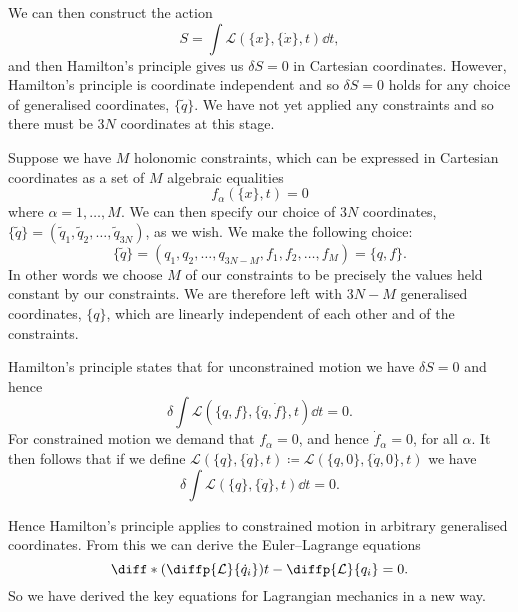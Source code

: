\documentclass[fleqn]{NotesClass}
\newcommand*{\lagrangian}{\mathcal{L}}
\begin{document}
    We can then construct the action
    \begin{equation}
        S = \int \!\! \lagrangian(\{x\}, \{\dot{x}\}, t) \dd{t},
    \end{equation}
    and then Hamilton's principle gives us \(\delta S = 0\) in Cartesian coordinates.
    However, Hamilton's principle is coordinate independent and so \(\delta S = 0\) holds for any choice of generalised coordinates, \(\{\tilde{q}\}\).
    We have not yet applied any constraints and so there must be \(3N\) coordinates at this stage.
    
    Suppose we have \(M\) holonomic constraints, which can be expressed in Cartesian coordinates as a set of \(M\) algebraic equalities
    \begin{equation}
        f_\alpha(\{x\}, t) = 0
    \end{equation}
    where \(\alpha = 1, \dotsc, M\).
    We can then specify our choice of \(3N\) coordinates, \(\{\tilde{q}\} = (\tilde{q}_1, \tilde{q}_2, \dotsc, \tilde{q}_{3N})\), as we wish.
    We make the following choice:
    \begin{equation}
        \{\tilde{q}\} = (q_1, q_2, \dotsc, q_{3N - M}, f_1, f_2, \dotsc, f_M) = \{q, f\}.
    \end{equation}
    In other words we choose \(M\) of our constraints to be precisely the values held constant by our constraints.
    We are therefore left with \(3N - M\) generalised coordinates, \(\{q\}\), which are linearly independent of each other and of the constraints.
    
    Hamilton's principle states that for unconstrained motion we have \(\delta S = 0\) and hence
    \begin{equation}
        \delta \int \!\! \lagrangian(\{q, f\}, \{\dot{q}, \dot{f}\}, t) \dd{t} = 0.
    \end{equation}
    For constrained motion we demand that \(f_\alpha = 0\), and hence \(\dot{f}_\alpha = 0\), for all \(\alpha\).
    It then follows that if we define \(\lagrangian(\{q\}, \{\dot{q}\}, t) \coloneqq \lagrangian(\{q, 0\}, \{\dot{q}, 0\}, t)\) we have
    \begin{equation}
        \delta\int \!\! \lagrangian(\{q\}, \{\dot{q}\}, t) \dd{t} = 0.
    \end{equation}
    
    Hence Hamilton's principle applies to constrained motion in arbitrary generalised coordinates.
    From this we can derive the Euler--Lagrange equations
    \begin{equation}
        \diff*{\left( \diffp{\lagrangian}{\dot{q}_i} \right)}{t} - \diffp{\lagrangian}{q_i} = 0.
    \end{equation}
    So we have derived the key equations for Lagrangian mechanics in a new way.
    
\end{document}
